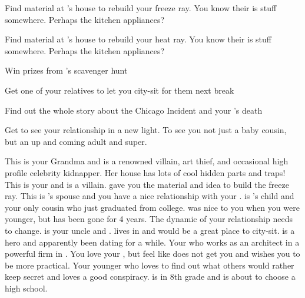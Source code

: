 \documentclass[char]{LRSguildcamp1}
\begin{document}
 
\begin{itemz}[Goals]
	\item Find material at \cGrandma{}'s house to rebuild your freeze ray. You know their is stuff somewhere. Perhaps the kitchen appliances? 
		\item Find material at \cGrandma{}'s house to rebuild your heat ray. You know their is stuff somewhere. Perhaps the kitchen appliances? 
		\item Win prizes from \cGrandma{}'s scavenger hunt
		\item Get one of your relatives to let you city-sit for them next break
		\item Find out the whole story about the Chicago Incident and your \cAS{\parent}'s death
		\item Get \cGrad{} to see your relationship in a new light. To see you not just a baby cousin, but an up and coming adult and super.
\end{itemz}

\begin{itemz}[Notes]
	\item 
\end{itemz}
\begin{contacts}
	\contact{\cGrandma{}} This is your Grandma and is a renowned villain, art thief, and occasional high profile celebrity kidnapper. Her house has lots of cool hidden parts and traps!
	\contact{\cOldest{}} This is your  \cOldest{\uncle} and is a villain.  gave you the material and idea to build the freeze ray.
	\contact{\cOS{}} This is \cOldest{}'s spouse and you have a nice relationship with your \cOS{\uncle}.
	\contact{\cGrad{}} \cGrad{} is \cOldest{}'s child and your only cousin who just graduated from college. \cGrad{} was nice to you when you were younger, but has been gone for 4 years. The dynamic of your relationship needs to change. 
	\contact{\cYoungest{}} \cYoungest{} is your uncle and \cYoungest{\hero}. \cYoungest{} lives in \pCityYoungest{} and would be a great place to city-sit.  
	\contact{\cYS{}} \cYS{} is a hero and apparently been dating \cYoungest{} for a while. 
	\contact{\cArchtect{}} Your \cArchitect{\parent} who works as an architect in a powerful firm in \pCityArchitect{}.  You love your \cArchitect{\parent}, but feel like \cArchitect{\they} does not get you and wishes you to be more practical. 
	 	\contact{\cTween{}} Your younger \cTween{\sibling} who loves to find out what others would rather keep secret and loves a good conspiracy. \cTween{} is in 8th grade and is about to choose a high school.
\end{contacts}
\end{document}

